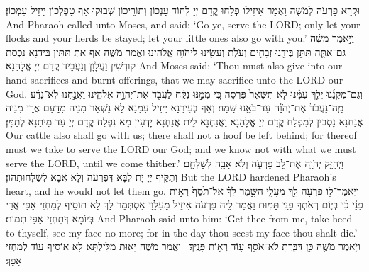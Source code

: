 {{}
{וּקְרָא פַרְעֹה לְמֹשֶׁה וַאֲמַר אִיזִילוּ פְלַחוּ קֳדָם יְיָ לְחוֹד עָנְכוֹן וְתוֹרֵיכוֹן שְׁבוּקוּ אַף טַפְלְכוֹן יֵיזֵיל עִמְּכוֹן׃}
{And Pharaoh called unto Moses, and said: ‘Go ye, serve the LORD; only let your flocks and your herds be stayed; let your little ones also go with you.’}{}
{וַיֹּ֣אמֶר מֹשֶׁ֔ה גַּם־אַתָּ֛ה תִּתֵּ֥ן בְּיָדֵ֖נוּ זְבָחִ֣ים וְעֹלֹ֑ת וְעָשִׂ֖ינוּ לַיהֹוָ֥ה אֱלֹהֵֽינוּ׃
}
{וַאֲמַר מֹשֶׁה אַף אַתְּ תִּתֵּין בִּידַנָא נִכְסַת קוּדְשִׁין וַעֲלָוָן וְנַעֲבֵיד קֳדָם יְיָ אֱלָהַנָא׃}
{And Moses said: ‘Thou must also give into our hand sacrifices and burnt-offerings, that we may sacrifice unto the LORD our God.}{}
{וְגַם־מִקְנֵ֜נוּ יֵלֵ֣ךְ עִמָּ֗נוּ לֹ֤א תִשָּׁאֵר֙ פַּרְסָ֔ה כִּ֚י מִמֶּ֣נּוּ נִקַּ֔ח לַעֲבֹ֖ד אֶת־יְהֹוָ֣ה אֱלֹהֵ֑ינוּ וַאֲנַ֣חְנוּ לֹֽא־נֵדַ֗ע מַֽה־נַּעֲבֹד֙ אֶת־יְהֹוָ֔ה עַד־בֹּאֵ֖נוּ שָֽׁמָּה׃
}
{וְאַף בְּעִירַנָא יֵיזֵיל עִמַּנָא לָא נַשְׁאַר מִנֵּיהּ מִדָּעַם אֲרֵי מִנֵּיהּ אֲנַחְנָא נָסְבִין לְמִפְלַח קֳדָם יְיָ אֱלָהַנָא וַאֲנַחְנָא לֵית אֲנַחְנָא יָדְעִין מָא נִפְלַח קֳדָם יְיָ עַד מֵיתַנָא לְתַמָּן׃}
{Our cattle also shall go with us; there shall not a hoof be left behind; for thereof must we take to serve the LORD our God; and we know not with what we must serve the LORD, until we come thither.’}{}
{וַיְחַזֵּ֥ק יְהֹוָ֖ה אֶת־לֵ֣ב פַּרְעֹ֑ה וְלֹ֥א אָבָ֖ה לְשַׁלְּחָֽם׃}
{וְתַקֵּיף יְיָ יָת לִבָּא דְּפַרְעֹה וְלָא אֲבָא לְשַׁלָּחוּתְהוֹן׃}
{But the LORD hardened Pharaoh’s heart, and he would not let them go.}{}
{וַיֹּֽאמֶר־ל֥וֹ פַרְעֹ֖ה לֵ֣ךְ מֵעָלָ֑י הִשָּׁ֣מֶר לְךָ֗ אַל־תֹּ֙סֶף֙ רְא֣וֹת פָּנַ֔י כִּ֗י בְּי֛וֹם רְאֹתְךָ֥ פָנַ֖י תָּמֽוּת׃}
{וַאֲמַר לֵיהּ פַּרְעֹה אִיזֵיל מֵעִלָּוָי אִסְתְּמַר לָךְ לָא תוֹסֵיף לְמִחְזֵי אַפַּי אֲרֵי בְּיוֹמָא דְּתִחְזֵי אַפַּי תְּמוּת׃}
{And Pharaoh said unto him: ‘Get thee from me, take heed to thyself, see my face no more; for in the day thou seest my face thou shalt die.’}{}
{וַיֹּ֥אמֶר מֹשֶׁ֖ה כֵּ֣ן דִּבַּ֑רְתָּ לֹא־אֹסִ֥ף ע֖וֹד רְא֥וֹת פָּנֶֽיךָ׃ \petucha 
{}}
{וַאֲמַר מֹשֶׁה יָאוּת מַלֵּילְתָּא לָא אוֹסֵיף עוֹד לְמִחְזֵי אַפָּךְ׃}
}
